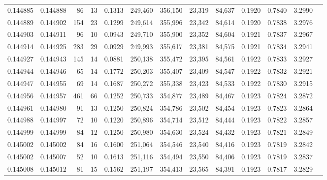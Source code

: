 \begin{tabular}{rrrrrrrrrrrrr}
0.144885 & 0.144888 &    86 &  13 &                                     0.1313 & 249,460 & 356,150 &  23,319 &  84,637 & 0.1920 & 0.7840 & 3.2990 \\
0.144889 & 0.144902 &   154 &  23 &                                     0.1299 & 249,614 & 355,996 &  23,342 &  84,614 & 0.1920 & 0.7838 & 3.2976 \\
0.144903 & 0.144911 &    96 &  10 &                                     0.0943 & 249,710 & 355,900 &  23,352 &  84,604 & 0.1921 & 0.7837 & 3.2967 \\
0.144914 & 0.144925 &   283 &  29 &                                     0.0929 & 249,993 & 355,617 &  23,381 &  84,575 & 0.1921 & 0.7834 & 3.2941 \\
0.144927 & 0.144943 &   145 &  14 &                                     0.0881 & 250,138 & 355,472 &  23,395 &  84,561 & 0.1922 & 0.7833 & 3.2927 \\
0.144944 & 0.144946 &    65 &  14 &                                     0.1772 & 250,203 & 355,407 &  23,409 &  84,547 & 0.1922 & 0.7832 & 3.2921 \\
0.144947 & 0.144955 &    69 &  14 &                                     0.1687 & 250,272 & 355,338 &  23,423 &  84,533 & 0.1922 & 0.7830 & 3.2915 \\
0.144956 & 0.144957 &   461 &  66 &                                     0.1252 & 250,733 & 354,877 &  23,489 &  84,467 & 0.1923 & 0.7824 & 3.2872 \\
0.144961 & 0.144980 &    91 &  13 &                                     0.1250 & 250,824 & 354,786 &  23,502 &  84,454 & 0.1923 & 0.7823 & 3.2864 \\
0.144988 & 0.144997 &    72 &  10 &                                     0.1220 & 250,896 & 354,714 &  23,512 &  84,444 & 0.1923 & 0.7822 & 3.2857 \\
0.144999 & 0.144999 &    84 &  12 &                                     0.1250 & 250,980 & 354,630 &  23,524 &  84,432 & 0.1923 & 0.7821 & 3.2849 \\
0.145002 & 0.145002 &    84 &  16 &                                     0.1600 & 251,064 & 354,546 &  23,540 &  84,416 & 0.1923 & 0.7819 & 3.2842 \\
0.145002 & 0.145007 &    52 &  10 &                                     0.1613 & 251,116 & 354,494 &  23,550 &  84,406 & 0.1923 & 0.7819 & 3.2837 \\
0.145008 & 0.145012 &    81 &  15 &                                     0.1562 & 251,197 & 354,413 &  23,565 &  84,391 & 0.1923 & 0.7817 & 3.2829 \\

\end{tabular}
